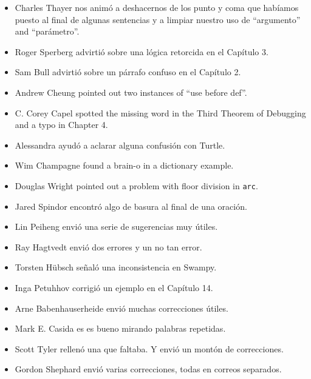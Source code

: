 \documentclass[10pt]{book}
\begin{document}
\begin{itemize}
\item Charles Thayer nos animó a deshacernos de los punto y coma que
habíamos puesto al final de algunas sentencias y a limpiar nuestro
uso de ``argumento'' and ``parámetro''.

\item Roger Sperberg advirtió sobre una lógica retorcida en el Capítulo 3.

\item Sam Bull advirtió sobre un párrafo confuso en el Capítulo 2.

\item Andrew Cheung pointed out two instances of ``use before def''.

\item C. Corey Capel spotted the missing word in the Third Theorem
of Debugging and a typo in Chapter 4.

\item Alessandra ayudó a aclarar alguna confusión con Turtle.

\item Wim Champagne found a brain-o in a dictionary example.

\item Douglas Wright pointed out a problem with floor division in
{\tt arc}.

\item Jared Spindor encontró algo de basura al final de una oración.

\item Lin Peiheng envió una serie de sugerencias muy útiles.

\item Ray Hagtvedt envió dos errores y un no tan error.

\item Torsten H\"{u}bsch señaló una inconsistencia en Swampy.

\item Inga Petuhhov corrigió un ejemplo en el Capítulo 14.

\item Arne Babenhauserheide envió muchas correcciones útiles.

\item Mark E. Casida es es bueno mirando palabras repetidas.

\item Scott Tyler rellenó una que faltaba.  Y envió
un montón de correcciones.

\item Gordon Shephard envió varias correcciones, todas en correos
separados.


\end{itemize}
\end{document}
